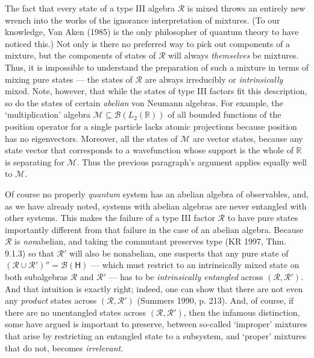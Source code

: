 \documentclass[12pt]{article}
\newcommand{\alg}[1]{\mbox{$\mathcal{#1}$}}
\newcommand{\hil}[1]{\mbox{$\mathsf{#1}$}}
\begin{document}
 The fact that every state of a type III algebra $\alg{R}$ is 
 mixed throws an entirely new wrench into the works of the ignorance 
 interpretation of mixtures.  (To our knowledge, Van Aken (1985) is the only 
 philosopher of quantum theory to 
 have noticed this.)   Not only is  there no preferred way
  to pick out components of a mixture, but the components of 
 states of $\alg{R}$ will always \emph{themselves} be mixtures.  Thus, 
 it is impossible to understand the preparation of such a mixture
 in terms of mixing pure states --- 
 the states of $\alg{R}$ are always irreducibly or \emph{intrinsically} 
 mixed.  
 Note, however, that while the states of type III factors fit this description, so 
 do the states of certain \emph{abelian} von Neumann algebras.  For example, the  
 `multiplication' algebra $\alg{M}\subseteq \alg{B}(L_{2}(\mathbb{R}))$ of 
 all bounded functions of the position operator for a single 
 particle lacks atomic projections because position has no 
 eigenvectors.  Moreover, all 
 the states of $\alg{M}$ are vector states, because any state vector 
 that corresponds to a wavefunction 
 whose support is the whole of $\mathbb{R}$ is separating for 
 $\alg{M}$.  Thus 
 the previous paragraph's argument applies equally well to $\alg{M}$.  
 
 Of course
  no properly \emph{quantum} system has an abelian algebra of 
 observables, and, as we have already noted, systems with abelian algebras 
 are never entangled with other systems.  This makes the failure of a 
 type III factor $\alg{R}$ to have pure states importantly different from that 
 failure in the case of an abelian algebra. 
 Because $\alg{R}$ is \emph{non}abelian, and taking the 
 commutant preserves type (KR 1997, Thm. 9.1.3) so that $\alg{R}'$ 
 will also be nonabelian, one suspects
 that any pure 
 state of $(\alg{R}\cup\alg{R}')''=\alg{B}(\hil{H})$ --- which must 
 restrict to an intrinsically mixed state on both subalgebras 
 $\alg{R}$ and $\alg{R}'$ --- has to be 
 \emph{intrinsically entangled} across $(\alg{R},\alg{R}')$.  And that intuition is exactly 
 right; indeed, one can show that there 
 are not even any \emph{product} states across $(\alg{R},\alg{R}')$ 
 (Summers 1990, p. 
 213).  
 And, of course, if there are no unentangled states across 
 $(\alg{R},\alg{R}')$, then the infamous distinction, some have argued is 
 important to preserve, between so-called `improper' mixtures 
 that arise by restricting an entangled state to a subsystem, and 
 `proper' mixtures that do not, becomes \emph{irrelevant}.  
 
\end{document}
